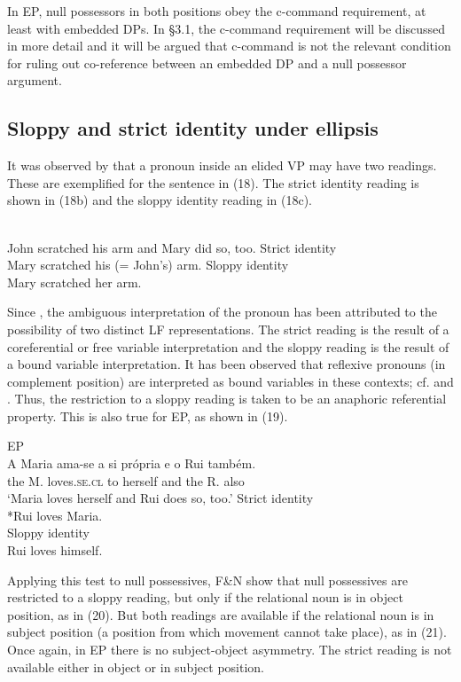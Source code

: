 \documentclass[output=paper]{langsci/langscibook}
\begin{document}
In EP, null possessors in both positions obey the c-command requirement, at least with embedded DPs. In §3.1, the c-command requirement will be discussed in more detail and it will be argued that c-command is not the relevant condition for ruling out co-reference between an embedded DP and a null possessor argument.

\subsection{Sloppy and strict identity under ellipsis}%

It was observed by \citet{Ross1967,Ross1969} that a pronoun inside an elided VP may have two readings. These are exemplified for the sentence in (18). The strict identity reading is shown in (18b) and the sloppy identity reading in (18c).

\ea%
\citep[207]{Ross1967}\label{ex:wein:18}\\
\ea John scratched his arm and Mary did so, too.
\ex Strict identity\\Mary scratched his (= John’s) arm.
\ex Sloppy identity\\Mary scratched her arm.
\z
\z

Since \citet{Sag1980}, the ambiguous interpretation of the pronoun has been attributed to the possibility of two distinct LF representations. The strict reading is the result of a coreferential or free variable interpretation and the sloppy reading is the result of a bound variable interpretation. It has been observed that reflexive pronouns (in complement position) are interpreted as bound variables in these contexts; cf. \citet{Sag1980} and \citet{Hicks2009}. Thus, the restriction to a sloppy reading is taken to be an anaphoric referential property. This is also true for EP, as shown in (19).

\ea%
    EP\label{ex:wein:19}\\
    \ea \gll A Maria ama-se a {si própria} e o Rui também.\\
         the M. loves.\textsc{se.cl} to herself and the R. also\\
    \glt ‘Maria loves herself and Rui does so, too.’
    \ex Strict identity\\
        *Rui loves Maria.\\
    \ex Sloppy identity\\
        Rui loves himself.
    \z
\z
          
Applying this test to null possessives, F\&N show that null possessives are restricted to a sloppy reading, but only if the relational noun is in object position, as in (20). But both readings are available if the relational noun is in subject position (a position from which movement cannot take place), as in (21). Once again, in EP there is no subject-object asymmetry. The strict reading is not available either in object or in subject position.
\end{document}
